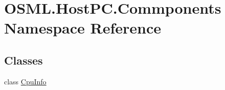 \hypertarget{namespaceOSML_1_1HostPC_1_1Commponents}{}\section{O\+S\+M\+L.\+Host\+P\+C.\+Commponents Namespace Reference}
\label{namespaceOSML_1_1HostPC_1_1Commponents}
\subsection*{Classes}
\begin{DoxyCompactItemize}
\item 
class \mbox{\hyperlink{classOSML_1_1HostPC_1_1Commponents_1_1CpuInfo}{Cpu\+Info}}
\end{DoxyCompactItemize}
